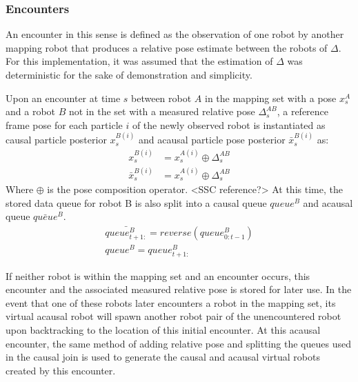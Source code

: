 \subsubsection{Encounters}
An encounter in this sense is defined as the observation of one robot by another mapping robot that produces a relative pose estimate between the robots of $\Delta$. For this implementation, it was assumed that the estimation of $\Delta$ was deterministic for the sake of demonstration and simplicity.

Upon an encounter at time $s$ between robot $A$ in the mapping set with a pose $x_s^A$ and a robot $B$ not in the set with a measured relative pose $\Delta_s^{AB}$, a reference frame pose for each particle $i$ of the newly observed robot is instantiated as causal particle posterior $x_s^{B(i)}$ and acausal particle pose posterior $\bar{x}_s^{B(i)}$ as:
\begin{align*}
x_s^{B(i)} &= x_s^{A(i)} \oplus \Delta_s^{AB} \\
\bar{x}_s^{B(i)} &= x_s^{A(i)} \oplus \Delta_s^{AB}
\end{align*}
Where $\oplus$ is the pose composition operator. <SSC reference?>
At this time, the stored data queue for robot B is also split into a causal queue $queue^B$ and acausal queue $\bar{queue}^B$.
\begin{align*}
\bar{queue_{t+1:}^B} = reverse(queue_{0:t-1}^B) \\
queue^B = queue_{t+1:}^B
\end{align*}

If neither robot is within the mapping set and an encounter occurs, this encounter and the associated measured relative pose is stored for later use. In the event that one of these robots later encounters a robot in the mapping set, its virtual acausal robot will spawn another robot pair of the unencountered robot upon backtracking to the location of this initial encounter. At this acausal encounter, the same method of adding relative pose and splitting the queues used in the causal join is used to generate the causal and acausal virtual robots created by this encounter.


